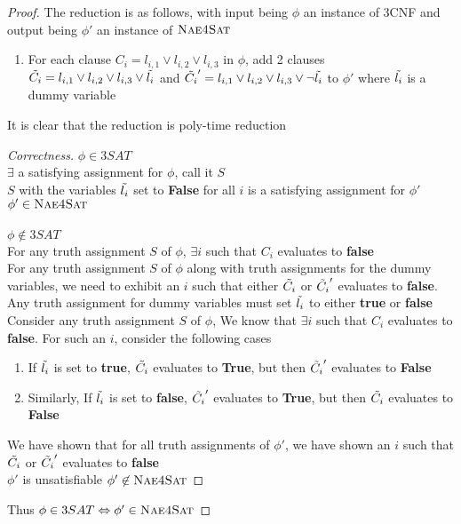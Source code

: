 \begin{proof}
    The reduction is as follows, with input being $\phi$ an instance of 3CNF and output being $\phi'$ an instance of $\textsc{Nae4Sat}$
    \begin{enumerate}
        \item For each clause $C_i = l_{i, 1} \lor l_{i, 2} \lor l_{i, 3}$ in $\phi$, add 2 clauses $\Tilde{C_i} = l_{i, 1} \lor l_{i, 2} \lor l_{i, 3} \lor \Tilde{l_i}$ and $\Tilde{C_i}' = l_{i, 1} \lor l_{i, 2} \lor l_{i, 3} \lor \neg \Tilde{l_i}$ to $\phi'$ where $\Tilde{l_i}$ is a dummy variable
    \end{enumerate}

    It is clear that the reduction is poly-time reduction
    \begin{proof}
        [Correctness]
        $\phi \in 3SAT$\\
        \imp
        $\exists$ a satisfying assignment for $\phi$, call it $S$\\
        \imp
        $S$  with the variables $\Tilde{l_i}$ set to \textbf{False} for all $i$ is a satisfying assignment for $\phi'$\\
        \imp
        $\phi' \in \textsc{Nae4Sat}$\\\\
        $\phi \not \in 3SAT$\\
        \imp
        For any truth assignment $S$ of $\phi$, $\exists i$ such that $C_i$ evaluates to \textbf{false}\\
        \imp
        For any truth assignment $S$ of $\phi$ along with truth assignments for the dummy  variables, we need to exhibit an $i$ such that either $\Tilde{C_i}$ or $\Tilde{C_i}'$ evaluates to \textbf{false}.\\
        Any truth assignment for dummy variables must set $\Tilde{l_i}$ to either \textbf{true} or \textbf{false}\\
        Consider any truth assignment $S$ of $\phi$, We know that $\exists i$ such that $C_i$ evaluates to \textbf{false}. For such an $i$, consider the following cases
        \begin{enumerate}
            \item If $\Tilde{l_i}$ is set to \textbf{true}, $\Tilde{C_i}$ evaluates to \textbf{True}, but then $\Tilde{C_i}'$ evaluates to \textbf{False}
            \item Similarly, If $\Tilde{l_i}$ is set to \textbf{false}, $\Tilde{C_i}'$ evaluates to \textbf{True}, but then $\Tilde{C_i}$ evaluates to \textbf{False}
        \end{enumerate}
        \imp
        We have shown that for all truth assignments of $\phi'$, we have shown an $i$ such that $\Tilde{C_i}$ or $\Tilde{C_i}'$ evaluates to \textbf{false}\\
        \imp
        $\phi'$ is unsatisfiable
        \imp
        $\phi' \not \in \textsc{Nae4Sat}$
    \end{proof} 
            Thus $\phi \in 3SAT \Leftrightarrow \phi' \in \textsc{Nae4Sat}$
\end{proof}

